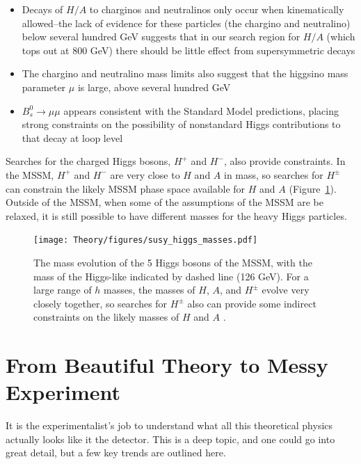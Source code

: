 \begin{itemize}
    \item Decays of $H/A$ to charginos and neutralinos only occur when kinematically 
allowed--the lack of evidence for these particles (the chargino and neutralino) below several hundred GeV suggests
that in our search region for $H/A$ (which tops out at 800 GeV) there should be little
effect from supersymmetric decays
    \item The chargino and neutralino mass limits also suggest that the higgsino mass
parameter $\mu$ is large, above several hundred GeV
    \item $B_s^0\rightarrow\mu\mu$ appears consistent with the Standard Model predictions,
placing strong constraints on the possibility of nonstandard Higgs contributions
to that decay at loop level \cite{bs_to_mumu}
\end{itemize}

Searches for the charged Higgs bosons, $H^+$ and $H^-$, also provide constraints.
In the MSSM, $H^+$ and $H^-$ are very close to $H$ and $A$ in mass, so searches
for $H^\pm$ can constrain the likely MSSM phase space available for $H$ and $A$ (Figure~\ref{fig:susy_higgs_masses}).
Outside of the MSSM, when some of the assumptions of the MSSM are be relaxed,
it is still possible to have different masses for the heavy Higgs particles.


\begin{figure}
	\centering
	\texttt{[image: Theory/figures/susy\_higgs\_masses.pdf]}
	\caption{The mass evolution of the 5 Higgs bosons of the MSSM, with the 
    mass of the Higgs-like indicated by dashed line (126 GeV).  For a large
    range of $h$ masses, the masses of $H$, $A$, and $H^\pm$ evolve very closely
    together, so searches for $H^\pm$ also can provide some indirect constraints
    on the likely masses of $H$ and $A$ \cite{ellis}. 
    \label{fig:susy_higgs_masses}}
\end{figure}
 


\section{From Beautiful Theory to Messy Experiment}

It is the experimentalist's job to understand what all this theoretical physics actually 
looks like it the detector.  This is a deep topic, and one could 
go into great detail, but a few key trends are outlined here.

